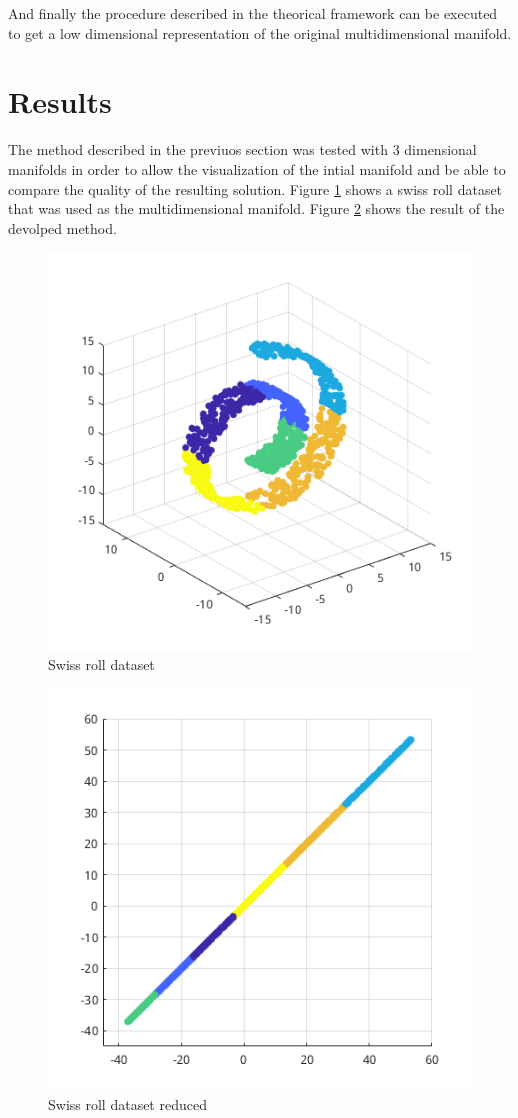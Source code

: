 \documentclass[12pt,journal]{IEEEtran}
\begin{document}
And finally the procedure described in the theorical framework can be executed
to get a low dimensional representation of the original multidimensional
manifold.

\section{Results}

The method described in the previuos section was tested with 3 dimensional
manifolds in order to allow the visualization of the intial manifold and be able
to compare the quality of the resulting solution. Figure \ref{swiss} shows
a swiss roll dataset that was used as the multidimensional manifold. Figure
\ref{swiss_res} shows the result of the devolped method.

\begin{figure}[H]
    \centering
    \includegraphics[width=0.7\linewidth]{images/swiss_roll.png}
    \caption{Swiss roll dataset}
    \label{swiss}
\end{figure}

\begin{figure}[H]
    \centering
    \includegraphics[width=0.7\linewidth]{images/swiss_roll_result.png}
    \caption{Swiss roll dataset reduced}
    \label{swiss_res}
\end{figure}
\end{document}
